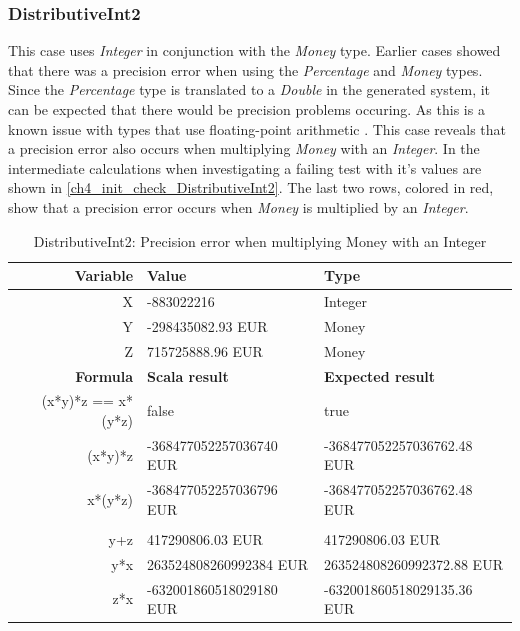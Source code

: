 \subsubsection{DistributiveInt2}
\label{ssct:ch5_distributiveInt2}
This case uses \textit{Integer} in conjunction with the \textit{Money} type. Earlier cases showed that there was a precision error when using the \textit{Percentage} and \textit{Money} types. Since the \textit{Percentage} type is translated to a \textit{Double} in the generated system, it can be expected that there would be precision problems occuring. As this is a known issue with types that use floating-point arithmetic \cite{goldberg1991every}. This case reveals that a precision error also occurs when multiplying \textit{Money} with an \textit{Integer}. In the intermediate calculations when investigating a failing test with it's values are shown in \autoref{ch4_init_check_DistributiveInt2}. The last two rows, colored in red, show that a precision error occurs when \textit{Money} is multiplied by an \textit{Integer}.
\FloatBarrier
\begin{table}[!ht]
\centering
\begin{tabular}{rll}
\hline
\textbf{Variable}  & \textbf{Value}          & \textbf{Type}              \\ \hline
X                  & -883022216              & Integer                    \\
Y                  & -298435082.93 EUR       & Money                      \\
Z                  & 715725888.96 EUR        & Money                      \\ \hline
\textbf{Formula}   & \textbf{Scala result}   & \textbf{Expected result}   \\ \hline
(x*y)*z == x*(y*z) & false                   & true                       \\
(x*y)*z            & -368477052257036740 EUR & -368477052257036762.48 EUR \\
x*(y*z)            & -368477052257036796 EUR & -368477052257036762.48 EUR \\
                   &                         &                            \\
y+z                & 417290806.03 EUR        & 417290806.03 EUR           \\
y*x                & 263524808260992384 EUR  & 263524808260992372.88 EUR  \\
z*x                & -632001860518029180 EUR & -632001860518029135.36 EUR \\ \hline
\end{tabular}
\caption{DistributiveInt2: Precision error when multiplying Money with an Integer}
\label{ch4_init_check_DistributiveInt2}
\end{table}
\FloatBarrier

